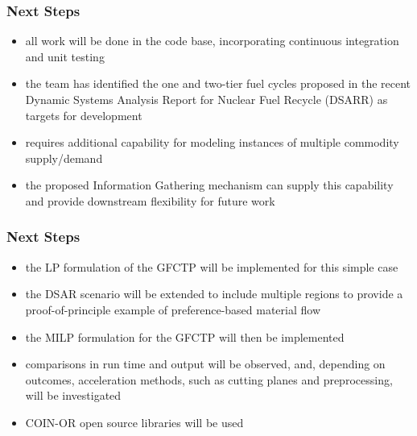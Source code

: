 \begin{frame}[ctb!]
  \frametitle{Next Steps} 
  
  \begin{itemize}
    \item all work will be done in the
      \href{github.com/cyclus/cyclus}{\Cyclus} code base, incorporating
      continuous integration and unit testing
    \item the \Cyclus team has identified the one and two-tier fuel cycles
      proposed in the recent Dynamic Systems Analysis Report for Nuclear Fuel
      Recycle (DSARR) \cite{dixon_dynamic_2008} as targets for
      development
    \item \Cyclus requires additional capability for modeling instances of
      multiple commodity supply/demand
    \item the proposed Information Gathering mechanism can supply this capability
      and provide downstream flexibility for future work
  \end{itemize}
\end{frame}

\begin{frame}[ctb!]
  \frametitle{Next Steps} 

  \begin{itemize}
    \item the LP formulation of the GFCTP will be implemented for this simple
      case
    \item the DSAR scenario will be extended to include multiple regions to
      provide a proof-of-principle example of preference-based material flow
    \item the MILP formulation for the GFCTP will then be implemented
    \item comparisons in run time and output will be observed, and, depending on
      outcomes, acceleration methods, such as cutting planes and preprocessing,
      will be investigated
    \item COIN-OR\cite{lougee_common_2003} open source libraries will be used
  \end{itemize}
\end{frame}

